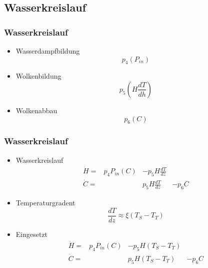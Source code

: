 \documentclass{beamer}
\begin{document}
\subsection{Wasserkreislauf}

\begin{frame}
	\frametitle{Wasserkreislauf}
	\begin{itemize}
		\item[] Wasserdampfbildung
			\begin{equation}
			p_4 (P_{in})
			\end{equation} 
		\pause
		\item[] Wolkenbildung
			\begin{equation}
			p_5 \left( H \frac{dT}{dh} \right)
			\end{equation}
		\pause
		\item[] Wolkenabbau 
		 	\begin{equation}
			p_6 (C)
			\end{equation}
	\end{itemize}
\end{frame}

\begin{frame}
	\frametitle{Wasserkreislauf}
	\begin{itemize}
	
		\item[] Wasserkreislauf
			\begin{equation}
				\begin{matrix}			
					\dot{H} = & p_4 P_{in}(C) & - p_5  H \frac{dT}{dz} & \\
					\dot{C} = &               &   p_5  H \frac{dT}{dz} & - p_6 C
				\end{matrix}	
			\end{equation}
	
		\item[] Temperaturgradent
			\begin{equation}
				\frac{dT}{dz} \approx \xi (T_S - T_T)
			\end{equation}
		
		\item[] Eingesetzt
			\begin{equation}
				\begin{matrix}			
					\dot{H} = & p_4 P_{in}(C) & - p_5 H (T_S - T_T) & \\
					\dot{C} = &               &   p_5 H (T_S - T_T) & - p_6 C
				\end{matrix}	
			\end{equation}			
		
	\end{itemize}
\end{frame}
\end{document}
